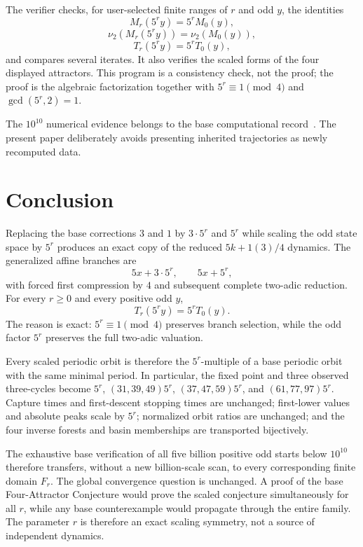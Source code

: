 \documentclass[11pt]{article}
\newcommand{\vTwo}{\nu_2}
\begin{document}
The verifier checks, for user-selected finite ranges of $r$ and odd $y$, the identities
\[
M_r(5^ry)=5^rM_0(y),
\]
\[
\vTwo(M_r(5^ry))=\vTwo(M_0(y)),
\]
\[
T_r(5^ry)=5^rT_0(y),
\]
and compares several iterates. It also verifies the scaled forms of the four displayed attractors. This program is a consistency check, not the proof; the proof is the algebraic factorization together with $5^r\equiv1\pmod4$ and $\gcd(5^r,2)=1$.

The $10^{10}$ numerical evidence belongs to the base computational record~\cite{BanazadehBase}. The present paper deliberately avoids presenting inherited trajectories as newly recomputed data.

\section{Conclusion}
Replacing the base corrections $3$ and $1$ by $3\cdot5^r$ and $5^r$ while scaling the odd state space by $5^r$ produces an exact copy of the reduced $5k+1(3)/4$ dynamics. The generalized affine branches are
\[
5x+3\cdot5^r,\qquad 5x+5^r,
\]
with forced first compression by $4$ and subsequent complete two-adic reduction. For every $r\ge0$ and every positive odd $y$,
\[
T_r(5^ry)=5^rT_0(y).
\]
The reason is exact: $5^r\equiv1\pmod4$ preserves branch selection, while the odd factor $5^r$ preserves the full two-adic valuation.

Every scaled periodic orbit is therefore the $5^r$-multiple of a base periodic orbit with the same minimal period. In particular, the fixed point and three observed three-cycles become $5^r$, $(31,39,49)5^r$, $(37,47,59)5^r$, and $(61,77,97)5^r$. Capture times and first-descent stopping times are unchanged; first-lower values and absolute peaks scale by $5^r$; normalized orbit ratios are unchanged; and the four inverse forests and basin memberships are transported bijectively.

The exhaustive base verification of all five billion positive odd starts below $10^{10}$ therefore transfers, without a new billion-scale scan, to every corresponding finite domain $F_r$. The global convergence question is unchanged. A proof of the base Four-Attractor Conjecture would prove the scaled conjecture simultaneously for all $r$, while any base counterexample would propagate through the entire family. The parameter $r$ is therefore an exact scaling symmetry, not a source of independent dynamics.
\end{document}
